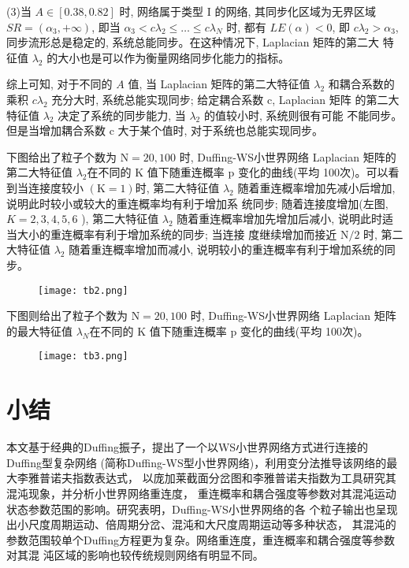(3)当 $A \in[0.38,0.82]$ 时, 网络属于类型 $\mathrm{I}$ 的网络, 其同步化区域为无界区域 $S R=\left(\alpha_3,+\infty\right)$,
即当 $\alpha_3<c \lambda_2 \leq \ldots \leq c \lambda_N$ 时, 都有 $L E(\alpha)<0$, 即 $c \lambda_2>\alpha_3$,
同步流形总是稳定的, 系统总能同步。在这种情况下, Laplacian 矩阵的第二大 特征值 $\lambda_2$ 的大小也是可以作为衡量网络同步化能力的指标。\par

综上可知, 对于不同的 $A$ 值, 当 Laplacian 矩阵的第二大特征值 $\lambda_2$ 和耦合系数的乘积 $c \lambda_2$ 充分大时,
系统总能实现同步; 给定耦合系数 $\mathrm{c}$, Laplacian 矩阵 的第二大特征值 $\lambda_2$ 决定了系统的同步能力,
当 $\lambda_2$ 的值较小时, 系统则很有可能 不能同步。但是当增加耦合系数 $\mathrm{c}$ 大于某个值时, 对于系统也总能实现同步。

下图给出了粒子个数为 $\mathrm{N}=20,100$ 时, Duffing-WS小世界网络 Laplacian 矩阵的第二大特征值 $\lambda_2$在不同的 $\mathrm{K}$ 值下随重连概率 $\mathrm{p}$
变化的曲线(平均 100次)。可以看到当连接度较小 $(\mathrm{K}=1)$时, 第二大特征值 $\lambda_2$ 随着重连概率增加先减小后增加,
说明此时较小或较大的重连概率均有利于增加系 统同步; 随着连接度增加(左图, $K=2,3,4,5,6$ ), 第二大特征值 $\lambda_2$
随着重连概率增加先增加后减小, 说明此时适当大小的重连概率有利于增加系统的同步; 当连接 度继续增加而接近 $\mathrm{N} / 2$ 时,
第二大特征值 $\lambda_2$ 随着重连概率增加而减小, 说明较小的重连概率有利于增加系统的同步。\par
\begin{figure}[!htbp]
    \centering
    \texttt{[image: tb2.png]}
\end{figure}
下图则给出了粒子个数为 $\mathrm{N}=20,100$ 时, Duffing-WS小世界网络 Laplacian 矩阵的最大特征值 $\lambda_N$在不同的 $\mathrm{K}$ 值下随重连概率 $\mathrm{p}$
变化的曲线(平均 100次)。
\begin{figure}[!htbp]
    \centering
    \texttt{[image: tb3.png]}
\end{figure}
\section{小结} 
本文基于经典的Duffing振子，提出了一个以WS小世界网络方式进行连接的Duffing型复杂网络
(简称Duffing-WS型小世界网络)，利用变分法推导该网络的最大李雅普诺夫指数表达式，
以庞加莱截面分岔图和李雅普诺夫指数为工具研究其混沌现象，并分析小世界网络重连度，
重连概率和耦合强度等参数对其混沌运动状态参数范围的影响。研究表明，Duffing-WS小世界网络的各
个粒子输出也呈现出小尺度周期运动、倍周期分岔、混沌和大尺度周期运动等多种状态，
其混沌的参数范围较单个Duffing方程更为复杂。网络重连度，重连概率和耦合强度等参数对其混
沌区域的影响也较传统规则网络有明显不同。